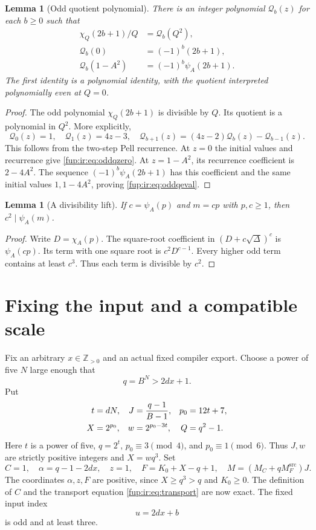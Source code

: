 \documentclass[11pt,letterpaper]{article}
\newtheorem{lemma}[theorem]{Lemma}
\theoremstyle{definition}\newtheorem{definition}[theorem]{Definition}
\theoremstyle{remark}\newtheorem{remark}[theorem]{Remark}
\newcommand{\pos}{\mathbb Z_{>0}}
\newcommand{\MFsrc}{M_F^{\mathrm{src}}}
\newcommand{\MC}{M_C}
\begin{document}
\begin{lemma}[Odd quotient polynomial]\label{fup:ir:lem:oddquotient}
There is an integer polynomial $\mathcal Q_b(z)$ for each $b\ge0$ such that
\begin{align}
 \chi_Q(2b+1)/Q&=\mathcal Q_b(Q^2),\label{fup:ir:eq:oddq}\\
 \mathcal Q_b(0)&=(-1)^b(2b+1),\label{fup:ir:eq:oddqzero}\\
 \mathcal Q_b(1-A^2)&=(-1)^b\psi_A(2b+1).\label{fup:ir:eq:oddqeval}
\end{align}
The first identity is a polynomial identity, with the quotient interpreted polynomially even at $Q=0$.
\end{lemma}
\begin{proof}
The odd polynomial $\chi_Q(2b+1)$ is divisible by $Q$. Its quotient is a polynomial in $Q^2$. More explicitly,
\[
 \mathcal Q_0(z)=1,\quad \mathcal Q_1(z)=4z-3,\quad
 \mathcal Q_{b+1}(z)=(4z-2)\mathcal Q_b(z)-\mathcal Q_{b-1}(z).
\]
This follows from the two-step Pell recurrence. At $z=0$ the initial values and recurrence give \eqref{fup:ir:eq:oddqzero}. At $z=1-A^2$, its recurrence coefficient is $2-4A^2$. The sequence $(-1)^b\psi_A(2b+1)$ has this coefficient and the same initial values $1,1-4A^2$, proving \eqref{fup:ir:eq:oddqeval}.
\end{proof}

\begin{lemma}[A divisibility lift]\label{fup:ir:lem:divisibility}
If $c=\psi_A(p)$ and $m=cp$ with $p,c\ge1$, then $c^2\mid\psi_A(m)$.
\end{lemma}
\begin{proof}
Write $D=\chi_A(p)$. The square-root coefficient in
$(D+c\sqrt\Delta)^c$ is $\psi_A(cp)$. Its term with one square root is $c^2D^{c-1}$. Every higher odd term contains at least $c^3$. Thus each term is divisible by $c^2$.
\end{proof}

\section{Fixing the input and a compatible scale}\label{fup:ir:sec:scale}
Fix an arbitrary $x\in\pos$ and an actual fixed compiler export. Choose a power of five $N$ large enough that
\[
 q=B^N>2dx+1.
\]
Put
\begin{align}
 t&=dN,& J&=\frac{q-1}{B-1},&p_0&=12t+7,\label{fup:ir:eq:context}\\
 X&=2^{p_0},& w&=2^{p_0-3t},&Q&=q^2-1.\notag
\end{align}
Here $t$ is a power of five, $q=2^t$, $p_0\equiv3\pmod4$, and $p_0\equiv1\pmod6$. Thus $J,w$ are strictly positive integers and $X=wq^3$. Set
\begin{equation}\label{fup:ir:eq:outerconstants}
 C=1,\quad\alpha=q-1-2dx,\quad z=1,\quad
 F=K_0+X-q+1,\quad M=(\MC+q\MFsrc)J.
\end{equation}
The coordinates $\alpha,z,F$ are positive, since $X\ge q^3>q$ and $K_0\ge0$. The definition of $C$ and the transport equation \eqref{fup:ir:eq:transport} are now exact. The fixed input index
\[
 u=2dx+b
\]
is odd and at least three.
\end{document}

